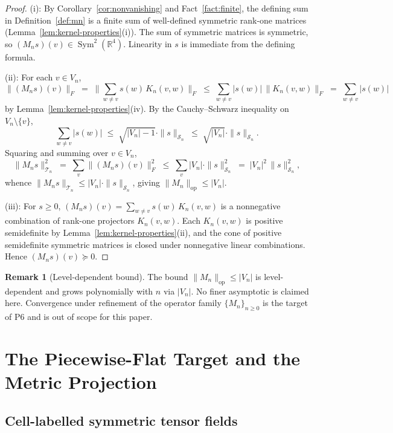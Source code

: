 \documentclass[11pt, a4paper]{amsart}
\theoremstyle{definition}
\newtheorem{remark}[theorem]{Remark}
\newcommand{\R}{\mathbb{R}}
\newcommand{\op}{\operatorname{op}}
\newcommand{\Sym}{\operatorname{Sym}}
\begin{document}
\begin{proof}
(i): By Corollary~\ref{cor:nonvanishing} and
Fact~\ref{fact:finite}, the defining sum in
Definition~\ref{def:mn} is a finite sum of well-defined symmetric
rank-one matrices (Lemma~\ref{lem:kernel-properties}(i)). The sum
of symmetric matrices is symmetric, so $(M_n s)(v) \in
\Sym^2(\R^4)$. Linearity in $s$ is immediate from the defining
formula.

(ii): For each $v \in V_n$,
\[
  \|(M_n s)(v)\|_F
    \;=\; \biggl\|\sum_{w \neq v} s(w)\,K_n(v, w)\biggr\|_F
    \;\leq\; \sum_{w \neq v} |s(w)|\,\|K_n(v, w)\|_F
    \;=\; \sum_{w \neq v} |s(w)|
\]
by Lemma~\ref{lem:kernel-properties}(iv). By the Cauchy--Schwarz
inequality on $V_n \setminus \{v\}$,
\[
  \sum_{w \neq v} |s(w)|
    \;\leq\; \sqrt{|V_n| - 1} \cdot \|s\|_{\mathcal S_n}
    \;\leq\; \sqrt{|V_n|} \cdot \|s\|_{\mathcal S_n}.
\]
Squaring and summing over $v \in V_n$,
\[
  \|M_n s\|_{\mathcal T_n}^2
    \;=\; \sum_v \|(M_n s)(v)\|_F^2
    \;\leq\; \sum_v |V_n|\cdot \|s\|_{\mathcal S_n}^2
    \;=\; |V_n|^2\,\|s\|_{\mathcal S_n}^2,
\]
whence $\|M_n s\|_{\mathcal T_n} \leq |V_n|\cdot
\|s\|_{\mathcal S_n}$, giving $\|M_n\|_\op \leq |V_n|$.

(iii): For $s \geq 0$, $(M_n s)(v) = \sum_{w \neq v}
s(w)\,K_n(v, w)$ is a nonnegative combination of rank-one
projectors $K_n(v, w)$. Each $K_n(v, w)$ is positive
semidefinite by Lemma~\ref{lem:kernel-properties}(ii), and the
cone of positive semidefinite symmetric matrices is closed under
nonnegative linear combinations. Hence $(M_n s)(v) \succeq 0$.
\end{proof}

\begin{remark}[Level-dependent bound]
\label{rmk:level-bound}
The bound $\|M_n\|_\op \leq |V_n|$ is level-dependent and grows
polynomially with $n$ via $|V_n|$. No finer asymptotic is
claimed here. Convergence under refinement of the operator
family $\{M_n\}_{n \geq 0}$ is the target of P6 and is out of
scope for this paper.
\end{remark}

\section{The Piecewise-Flat Target and the Metric Projection}
\label{sec:pf-target}

\subsection{Cell-labelled symmetric tensor fields}
\end{document}
